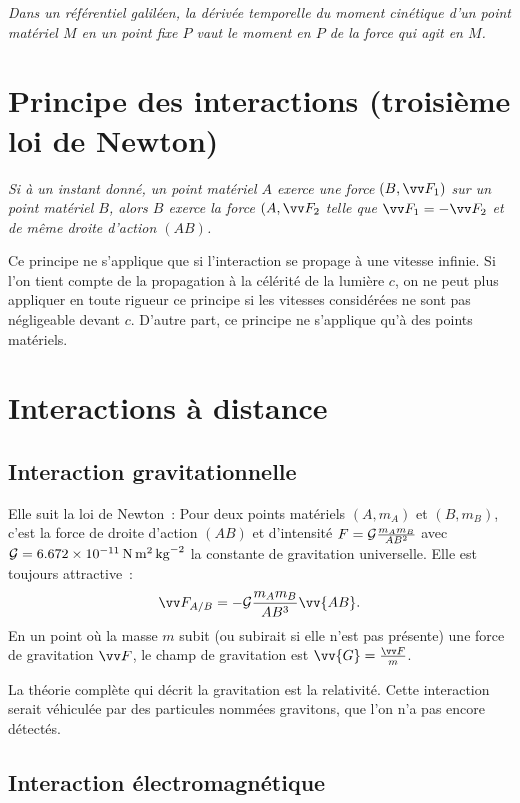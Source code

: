 \emph{Dans un référentiel galiléen, la dérivée temporelle du moment cinétique
d'un point matériel $M$ en un point fixe $P$ vaut le moment en $P$ de la
force qui agit en $M$.}

\section{Principe des interactions (troisième loi de Newton)}
\label{chap2-sec:principedesinteractions}

\emph{Si à un instant donné, un point matériel $A$ exerce une force
$(B,\vF_1)$ sur un point matériel $B$, alors $B$ exerce la force $(A, \vF_2$
telle que $\vF_1 =-\vF_2$ et de même droite d'action $(AB)$.}  

Ce principe ne s'applique que si l'interaction se propage à une vitesse
infinie. Si l'on tient compte de la propagation à la célérité de la lumière
$c$, on ne peut plus appliquer en toute rigueur ce principe si les vitesses
considérées ne sont pas négligeable devant $c$. D'autre part, ce principe ne
s'applique qu'à des points matériels.

\section{Interactions à distance}
\label{chap2-sec:interactionsadistance}

\subsection{Interaction gravitationnelle}
\label{chap2-subsec:interactiongravitationnelle}

Elle suit la loi de Newton~: Pour deux points matériels $(A, m_A)$ et $(B,
m_B)$, c'est la force de droite d'action $(AB)$ et d'intensité $F=\mathcal{G}
\frac{m_A m_B}{AB^2}$ avec $\mathcal{G} = \SI{6,672e-11}{N.m^2.kg^{-2}}$ la constante
de gravitation universelle. Elle est toujours attractive~: \begin{equation}
\vF_{A/B} = -\Gb \frac{m_A m_B}{AB^3}\vv{AB}. \end{equation} En un point où
la masse $m$ subit (ou subirait si elle n'est pas présente) une force de
gravitation $\vF$, le champ de gravitation est $\vv{G}=\frac{\vF}{m}$.

La théorie complète qui décrit la gravitation est la relativité. Cette
interaction serait véhiculée par des particules nommées gravitons, que l'on
n'a pas encore détectés.

\subsection{Interaction électromagnétique}
\label{chap2-subsec:interactionelectromagnetique}

